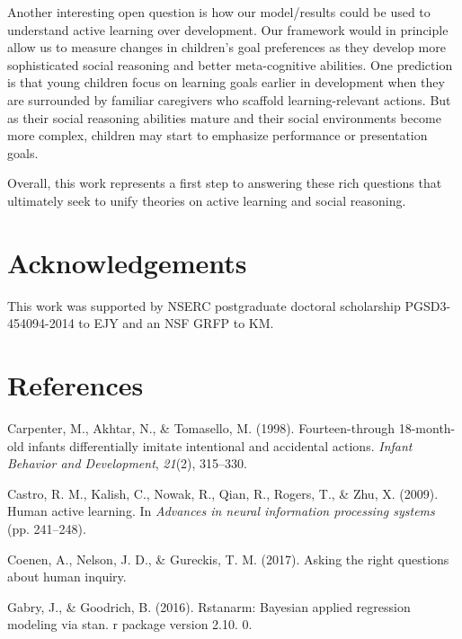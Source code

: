 \documentclass[10pt, letterpaper]{article}
\begin{document}
Another interesting open question is how our model/results could be used
to understand active learning over development. Our framework would in
principle allow us to measure changes in children's goal preferences as
they develop more sophisticated social reasoning and better
meta-cognitive abilities. One prediction is that young children focus on
learning goals earlier in development when they are surrounded by
familiar caregivers who scaffold learning-relevant actions. But as their
social reasoning abilities mature and their social environments become
more complex, children may start to emphasize performance or
presentation goals.

Overall, this work represents a first step to answering these rich
questions that ultimately seek to unify theories on active learning and
social reasoning.

\section{Acknowledgements}\label{acknowledgements}

This work was supported by NSERC postgraduate doctoral scholarship
PGSD3-454094-2014 to EJY and an NSF GRFP to KM.

\section{References}\label{references}

\setlength{\parindent}{-0.1in} \setlength{\leftskip}{0.125in}

\noindent

\hypertarget{refs}{}
\hypertarget{ref-carpenter1998fourteen}{}
Carpenter, M., Akhtar, N., \& Tomasello, M. (1998). Fourteen-through
18-month-old infants differentially imitate intentional and accidental
actions. \emph{Infant Behavior and Development}, \emph{21}(2), 315--330.

\hypertarget{ref-castro2009human}{}
Castro, R. M., Kalish, C., Nowak, R., Qian, R., Rogers, T., \& Zhu, X.
(2009). Human active learning. In \emph{Advances in neural information
processing systems} (pp. 241--248).

\hypertarget{ref-coenen2017}{}
Coenen, A., Nelson, J. D., \& Gureckis, T. M. (2017). Asking the right
questions about human inquiry.

\hypertarget{ref-gabry2016rstanarm}{}
Gabry, J., \& Goodrich, B. (2016). Rstanarm: Bayesian applied regression
modeling via stan. r package version 2.10. 0.
\end{document}

